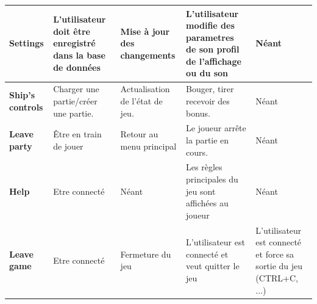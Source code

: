 \documentclass[utf8]{article}
\begin{document}
\begin{center}
\begin{longtable}{|p{}||p{}|p{}|p{}|p{}|}
\hline
\hline
\textbf{Settings}     & L'utilisateur doit être enregistré dans la base de données   & Mise à jour des changements  & L'utilisateur modifie des parametres de son profil de l'affichage ou du son  & Néant\\
\hline
\hline
\textbf{Ship’s controls}  & Charger une partie/créer une partie.   & Actualisation de l’état de jeu.  & Bouger, tirer recevoir des bonus.  & Néant\\
\hline
\hline
\textbf{Leave party}      & Être en train de jouer   & Retour au menu principal  & Le joueur arrête la partie en cours.  & Néant\\
\hline
\hline
\textbf{Help}      & Etre connecté   & Néant  & Les règles principales du jeu sont affichées au joueur & Néant\\
\hline
\hline
\textbf{Leave game}      & Etre connecté   & Fermeture du jeu  & L'utilisateur est connecté et veut quitter le jeu  & L'utilisateur est connecté et force sa sortie du jeu (CTRL+C, ...)\\
\hline
\end{longtable}
\end{center}
\end{document}
